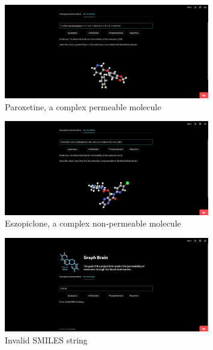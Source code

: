 \documentclass[fontsize=11pt]{article}
\begin{document}
\begin{figure}[h!]
    \centering
    \includegraphics[width=0.8\textwidth]{complex_p_paroxetine.png}
    \caption{Paroxetine, a complex permeable molecule}
    \label{fig:paroxetine}
\end{figure}

\begin{figure}[h!]
    \centering
    \includegraphics[width=0.8\textwidth]{complex_np_eszopiclone.png}
    \caption{Eszopiclone, a complex non-permeable molecule}
    \label{fig:eszopiclone}
\end{figure}

\begin{figure}[h!]
    \centering
    \includegraphics[width=0.8\textwidth]{invalid.png}
    \caption{Invalid SMILES string}
    \label{fig:invalid}
\end{figure}
\newpage

\end{document}
